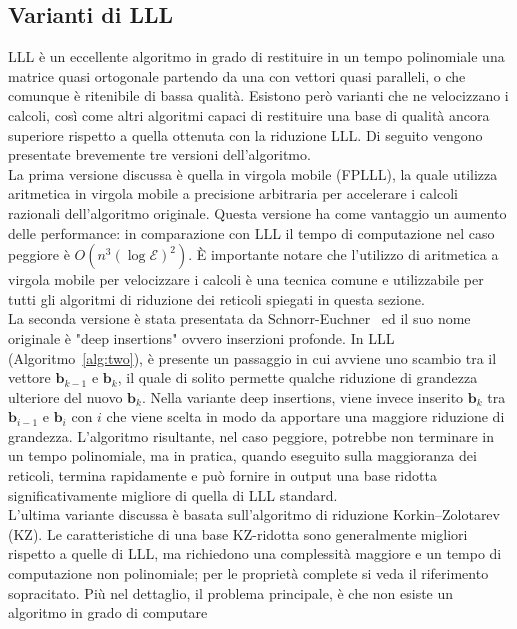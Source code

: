 \subsection{Varianti di LLL}
\label{sec:LLL-variants}
LLL è un eccellente algoritmo in grado di restituire in un tempo polinomiale una matrice 
quasi ortogonale partendo da una con vettori quasi paralleli, o che comunque è ritenibile 
di bassa qualità. Esistono però varianti che ne velocizzano i calcoli, 
così come altri algoritmi capaci di restituire una base di qualità ancora superiore 
rispetto a quella ottenuta con la riduzione LLL. Di seguito vengono presentate 
brevemente tre versioni dell'algoritmo. 
\\
La prima versione discussa è quella in virgola mobile (FPLLL)\cite{FPLLL05}, la quale 
utilizza aritmetica in virgola mobile a 
precisione arbitraria per accelerare i calcoli razionali dell'algoritmo originale. 
Questa versione ha come vantaggio un aumento delle performance: in comparazione con LLL
il tempo di computazione nel caso peggiore è $O(n^3 (\log\mathcal{E})^2)$. È importante notare che
l'utilizzo di aritmetica a virgola mobile per velocizzare i calcoli è una tecnica comune e utilizzabile
per tutti gli algoritmi di riduzione dei reticoli spiegati in questa sezione.
\\ 
La seconda versione è stata presentata da Schnorr-Euchner~\cite{DEEPLLL94} ed il suo nome
originale è "deep insertions" ovvero inserzioni profonde. In LLL (Algoritmo~\ref*{alg:two}),
è presente un passaggio in cui avviene uno scambio tra il vettore 
$\mathbf{b}_{k-1}$ e $\mathbf{b}_{k}$, il quale di solito permette qualche riduzione di grandezza
ulteriore del nuovo $\mathbf{b}_{k}$. Nella variante deep insertions, viene invece inserito
$\mathbf{b}_{k}$ tra $\mathbf{b}_{i-1}$ e $\mathbf{b}_{i}$ con $i$ che viene scelta in modo
da apportare una maggiore riduzione di grandezza. L'algoritmo risultante, nel caso peggiore,
potrebbe non terminare in un tempo polinomiale, ma in pratica, quando eseguito sulla maggioranza
dei reticoli, termina rapidamente e può fornire in output una base ridotta 
significativamente migliore di quella di LLL standard. 
\\
L'ultima variante discussa è basata sull'algoritmo di riduzione 
Korkin–Zolotarev (KZ)\cite[sezione 18.5]{Galbraith18}. Le caratteristiche di una base KZ-ridotta
sono generalmente migliori rispetto a quelle di LLL, ma richiedono una complessità maggiore
e un tempo di computazione non polinomiale; per le proprietà complete si veda il riferimento sopracitato. 
Più nel dettaglio, il problema principale, è che non esiste un algoritmo in grado di computare
